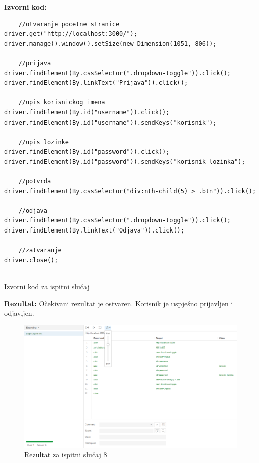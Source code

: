 			\noindent \textbf{Izvorni kod:}
\begin{lstlisting}
    //otvaranje pocetne stranice
driver.get("http://localhost:3000/");
driver.manage().window().setSize(new Dimension(1051, 806));

    //prijava
driver.findElement(By.cssSelector(".dropdown-toggle")).click();
driver.findElement(By.linkText("Prijava")).click();
    
    //upis korisnickog imena
driver.findElement(By.id("username")).click();
driver.findElement(By.id("username")).sendKeys("korisnik");
    
    //upis lozinke
driver.findElement(By.id("password")).click();
driver.findElement(By.id("password")).sendKeys("korisnik_lozinka");
    
    //potvrda
driver.findElement(By.cssSelector("div:nth-child(5) > .btn")).click();

    //odjava
driver.findElement(By.cssSelector(".dropdown-toggle")).click();
driver.findElement(By.linkText("Odjava")).click();

    //zatvaranje
driver.close();
 
\end{lstlisting}
			\begin{listing}[H]
				\caption{Izvorni kod za ispitni slučaj \thetestcase}
				\label{test3}
			\end{listing}
			\noindent \textbf{Rezultat:} Očekivani rezultat je ostvaren. Korisnik je uspješno prijavljen i odjavljen.
				\begin{figure}[H]
            					\includegraphics[scale=0.5]{dokumentacija/slike/selenium/LoginLogout.png}
            					\centering
            					\caption{Rezultat za ispitni slučaj 8}
            					\label{fig:test 8}
            		            \end{figure}
			\clearpage
		

